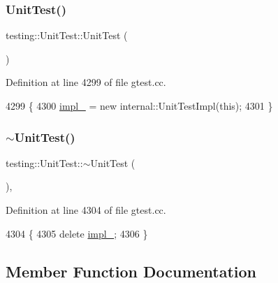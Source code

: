 \subsubsection{\texorpdfstring{Unit\+Test()}{UnitTest()}}
{\footnotesize\ttfamily testing\+::\+Unit\+Test\+::\+Unit\+Test (\begin{DoxyParamCaption}{ }\end{DoxyParamCaption})\hspace{0.3cm}{\ttfamily [private]}}



Definition at line 4299 of file gtest.\+cc.


\begin{DoxyCode}
4299                    \{
4300   \hyperlink{classtesting_1_1UnitTest_a834685f92009d21b21a7307f4cbfb6e5}{impl\_} = \textcolor{keyword}{new} internal::UnitTestImpl(\textcolor{keyword}{this});
4301 \}
\end{DoxyCode}
\mbox{\label{classtesting_1_1UnitTest_a8b66a9332e29673a6a389ea1731ee6b2}} 
\subsubsection{\texorpdfstring{$\sim$\+Unit\+Test()}{~UnitTest()}}
{\footnotesize\ttfamily testing\+::\+Unit\+Test\+::$\sim$\+Unit\+Test (\begin{DoxyParamCaption}{ }\end{DoxyParamCaption})\hspace{0.3cm}{\ttfamily [private]}, {\ttfamily [virtual]}}



Definition at line 4304 of file gtest.\+cc.


\begin{DoxyCode}
4304                     \{
4305   \textcolor{keyword}{delete} \hyperlink{classtesting_1_1UnitTest_a834685f92009d21b21a7307f4cbfb6e5}{impl\_};
4306 \}
\end{DoxyCode}


\subsection{Member Function Documentation}
\mbox{\label{classtesting_1_1UnitTest_aa59dde4c3dc43a920ed142a27670686c}} 
